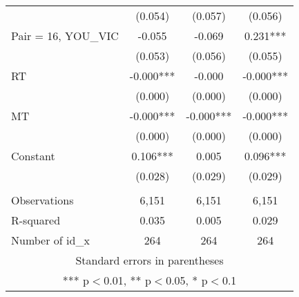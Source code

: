 \documentclass[]{article}
\begin{document}
\begin{tabular}{lccc}
 & (0.054) & (0.057) & (0.056) \\
Pair = 16, YOU\_VIC & -0.055 & -0.069 & 0.231*** \\
 & (0.053) & (0.056) & (0.055) \\
RT & -0.000*** & -0.000 & -0.000*** \\
 & (0.000) & (0.000) & (0.000) \\
MT & -0.000*** & -0.000*** & -0.000*** \\
 & (0.000) & (0.000) & (0.000) \\
Constant & 0.106*** & 0.005 & 0.096*** \\
 & (0.028) & (0.029) & (0.029) \\
 &  &  &  \\
Observations & 6,151 & 6,151 & 6,151 \\
R-squared & 0.035 & 0.005 & 0.029 \\
 Number of id\_x & 264 & 264 & 264 \\ \hline
\multicolumn{4}{c}{ Standard errors in parentheses} \\
\multicolumn{4}{c}{ *** p$<$0.01, ** p$<$0.05, * p$<$0.1} \\
\end{tabular}
\end{document}
